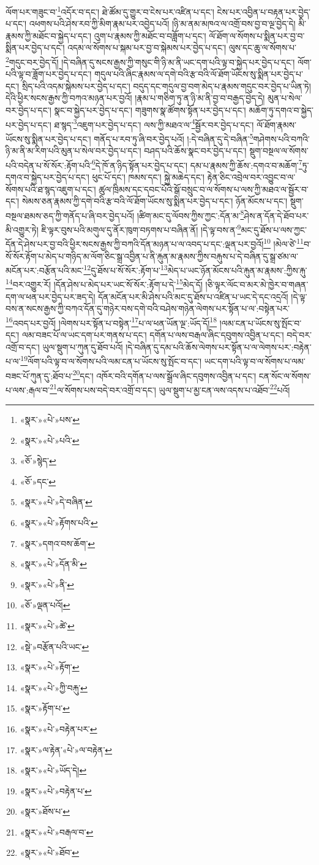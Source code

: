 ལོག་པར་གཟུང་བ་\footnote{«སྣར་»«པེ་»པས་}འདོར་བ་དང་། ཐེ་ཚོམ་དུ་གྱུར་བ་ངེས་པར་འཛིན་པ་དང་། ངེས་པར་འབྱིན་པ་བརྟན་པར་བྱེད་པ་དང་། འཕགས་པའི་ཤེས་རབ་ཀྱི་མིག་རྣམ་པར་འབྱེད་པའོ། །ཉི་མ་ནམ་མཁའ་ལ་འགྲོ་བས་བྱ་བ་ལྔ་བྱེད་དེ། མི་རྣམས་ཀྱི་མཐོང་བ་སྐྱེད་པ་དང་། འུག་པ་རྣམས་ཀྱི་མཐོང་བ་བཟློག་པ་དང་། ལོ་ཐོག་ལ་སོགས་པ་སྨིན་པར་བྱ་བ་སྨིན་པར་བྱེད་པ་དང་། འདམ་ལ་སོགས་པ་སྐམ་པར་བྱ་བ་སྐེམས་པར་བྱེད་པ་དང་། ལུས་དང་ཆུ་ལ་སོགས་པ་\footnote{«སྣར་»«པེ་»པའི་}གདུང་བར་བྱེད་དོ། །དེ་བཞིན་དུ་སངས་རྒྱས་ཀྱི་གསུང་གི་ཉི་མ་ནི་ཡང་དག་པའི་ལྟ་བ་སྐྱེད་པར་བྱེད་པ་དང་། ལོག་པའི་ལྟ་བ་ཟློག་པར་བྱེད་པ་དང་། གདུལ་པའི་ཞིང་རྣམས་ལ་དགེ་བའི་རྩ་བའི་ལོ་ཐོག་ཡོངས་སུ་སྨིན་པར་བྱེད་པ་དང་། སྲིད་པའི་འདམ་སྐེམས་པར་བྱེད་པ་དང་། བདུད་དང་གདུལ་བྱ་བག་མེད་པ་རྣམས་གདུང་བར་བྱེད་པ་ཡིན་ཏེ། དེའི་ཕྱིར་སངས་རྒྱས་ཀྱི་བཀའ་མཉན་པར་བྱའོ། །རྣམ་པ་གཅིག་ཏུ་ན་ཉི་མ་ནི་བྱ་བ་བརྒྱད་བྱེད་དེ། མུན་པ་སེལ་བར་བྱེད་པ་དང་། སྣང་བ་སྐྱེད་པར་བྱེད་པ་དང་། གཟུགས་སྣ་ཚོགས་སྟོན་པར་བྱེད་པ་དང་། མཆོག་ཏུ་དགའ་བ་སྐྱེད་པར་བྱེད་པ་དང་། ཐ་སྙད་\footnote{«ཅོ་»སྙེད་}འཇུག་པར་བྱེད་པ་དང་། ལས་ཀྱི་མཐའ་ལ་\footnote{«ཅོ་»དང་}སྦྱོར་བར་བྱེད་པ་དང་། ལོ་ཐོག་རྣམས་ཡོངས་སུ་སྨིན་པར་བྱེད་པ་དང་། གནོད་པ་རབ་ཏུ་ཞི་བར་བྱེད་པའོ། །:དེ་བཞིན་དུ་དེ་བཞིན་\footnote{«སྣར་»«པེ་»དེ་བཞིན་}གཤེགས་པའི་བཀའི་ཉི་མ་ནི་མ་རིག་པའི་མུན་པ་སེལ་བར་བྱེད་པ་དང་། བཤད་པའི་ཆོས་སྣང་བར་བྱེད་པ་དང་། སྡུག་བསྔལ་ལ་སོགས་པའི་བདེན་པ་སོ་སོར་:རྟོག་པའི་\footnote{«སྣར་»«པེ་»རྟོགས་པའི་}དེ་ཁོ་ན་ཉིད་སྟོན་པར་བྱེད་པ་དང་། དམ་པ་རྣམས་ཀྱི་ཆོས་:དགའ་བ་མཆོག་\footnote{«སྣར་»དགའ་བས་ཆོག་}ཏུ་དགའ་བ་སྐྱེད་པར་བྱེད་པ་དང་། ཕུང་པོ་དང་། ཁམས་དང་། སྐྱེ་མཆེད་དང་། རྟེན་ཅིང་འབྲེལ་བར་འབྱུང་བ་ལ་སོགས་པའི་ཐ་སྙད་འཇུག་པ་དང་། ཚུལ་ཁྲིམས་དང་དབང་པོའི་སྒོ་བསྲུང་བ་ལ་སོགས་པ་ལས་ཀྱི་མཐའ་ལ་སྦྱོར་བ་དང་། སེམས་ཅན་རྣམས་ཀྱི་དགེ་བའི་རྩ་བའི་ལོ་ཐོག་ཡོངས་སུ་སྨིན་པར་བྱེད་པ་དང་། ཉོན་མོངས་པ་དང་། སྡུག་བསྔལ་ཐམས་ཅད་ཀྱི་གནོད་པ་ཞི་བར་བྱེད་པའོ། །ཚིག་མང་དུ་ལོབས་ཀྱིས་ཀྱང་:དོན་མ་\footnote{«སྣར་»«པེ་»དོན་མི་}ཤེས་ན་དོན་དེ་ཐོབ་པར་མི་འགྱུར་ཏེ། ཇི་ལྟར་བུས་པའི་མགུལ་དུ་ནོར་ཁུག་བཏགས་པ་བཞིན་ནོ། །དེ་ལྟ་བས་ན་\footnote{«སྣར་»«པེ་»ནི་}མང་དུ་ཐོས་པ་ལས་ཀྱང་དོན་དེ་ཤེས་པར་བྱ་བའི་ཕྱིར་སངས་རྒྱས་ཀྱི་བཀའི་དོན་མཉན་པ་ལ་འབད་པ་དང་:ལྡན་པར་བྱའོ།\footnote{«ཅོ་»ལྡན་པའོ།} །མེལ་ཙེ་\footnote{«སྣར་»«པེ་»ཚེ་}བ་སོ་སོར་རྟོག་པ་མེད་པ་གཉིད་མ་ལོག་ཅིང་སྒྲ་འབྱིན་པ་ནི་རྐུན་མ་རྣམས་ཀྱིས་བརྐུས་པ་དེ་བཞིན་དུ་སྒྲ་ཙམ་ལ་མངོན་པར་:བརྩོན་པའི་མང་\footnote{«སྡེ་»བརྩོན་པའི་ཡང་}དུ་ཐོས་པ་སོ་སོར་:རྟོག་པ་\footnote{«སྣར་»«པེ་»རྟོག་}མེད་པ་ཡང་ཉོན་མོངས་པའི་རྐུན་མ་རྣམས་:ཀྱིས་རྐུ་\footnote{«སྣར་»«པེ་»ཀྱི་བརྐུ་}བར་འགྱུར་རོ། །དོན་ཤེས་པ་མེད་པར་ཡང་སོ་སོར་:རྟོག་པ་དེ་\footnote{«སྣར་»རྟོག་པ་}མེད་དོ། །ཅི་ལྟར་ལོང་བ་མར་མེ་ཁྱེར་བ་གཞན་དག་ལ་ཕན་པར་བྱེད་པར་ཟད་དེ། དོན་མངོན་པར་མི་ཤེས་པའི་མང་དུ་ཐོས་པ་འཛིན་པ་ཡང་དེ་དང་འདྲའོ། །དེ་ལྟ་བས་ན་སངས་རྒྱས་ཀྱི་བཀའ་དོན་དུ་གཉེར་བས་དགེ་བའི་བཤེས་གཉེན་ལེགས་པར་སྟོན་པ་ལ་:བསྟེན་པར་\footnote{«སྣར་»«པེ་»བརྟེན་པར་}འབད་པར་བྱའོ། །ལེགས་པར་སྟོན་པ་བསྟེན་\footnote{«སྣར་»ལ་རྟེན་«པེ་»ལ་བརྟེན་}པ་ལ་ཕན་ཡོན་ལྔ་:ཡོད་དོ།\footnote{«སྣར་»«པེ་»ཡོད་དེ།} །ལམ་ངན་པ་ཡོངས་སུ་སྤོང་བ་དང་། ལམ་བཟང་པོ་ལ་ཡང་དག་པར་གནས་པ་དང་། དགོན་པ་ལས་བརྒལ་ཞིང་དབུགས་འབྱིན་པ་དང་། བདེ་བར་འགྲོ་བ་དང་། ཡུལ་སྡུག་པ་ཀུན་དུ་ཐོབ་པའོ། །དེ་བཞིན་དུ་དམ་པའི་ཆོས་ལེགས་པར་སྟོན་པ་ལ་ལེགས་པར་:བརྟེན་པ་ལ་\footnote{«སྣར་»«པེ་»བརྟེན་པ་}ལོག་པའི་ལྟ་བ་ལ་སོགས་པའི་ལམ་ངན་པ་ཡོངས་སུ་སྤོང་བ་དང་། ཡང་དག་པའི་ལྟ་བ་ལ་སོགས་པ་ལམ་བཟང་པོ་ཀུན་དུ་:ཐོབ་པ་\footnote{«སྣར་»ཐོས་པ་}དང་། འཁོར་བའི་དགོན་པ་ལས་སྒྲོལ་ཞིང་དབུགས་འབྱིན་པ་དང་། ངན་སོང་ལ་སོགས་པ་ལས་:རྒལ་བ་\footnote{«སྣར་»«པེ་»བརྒལ་བ་}ལ་སོགས་པས་བདེ་བར་འགྲོ་བ་དང་། ཡུལ་སྡུག་པ་མྱ་ངན་ལས་འདས་པ་འཐོབ་\footnote{«སྣར་»«པེ་»ཐོབ་}པའོ། 